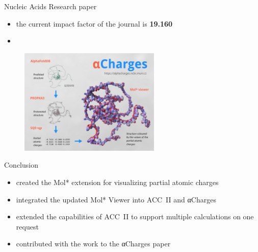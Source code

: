\documentclass[
]{beamer}
\begin{document}
\section[]{}

\begin{frame}{Nucleic Acids Research paper}
  \begin{itemize}
    \item the current impact factor of the journal is \textbf{19.160}
    \item {}
  \end{itemize}
  \begin{figure}
    \includegraphics[width=0.6\textwidth,keepaspectratio]{images/alpha-charges-visualization.jpeg}
  \end{figure}
\end{frame}

\begin{frame}{Conclusion}
  \begin{itemize}
    \item created the Mol* extension for visualizing partial atomic charges
    \item integrated the updated Mol* Viewer into ACC~II and αCharges
    \item extended the capabilities of ACC~II to support multiple calculations on one request
    \item contributed with the work to the αCharges paper
  \end{itemize}
\end{frame}
\end{document}

